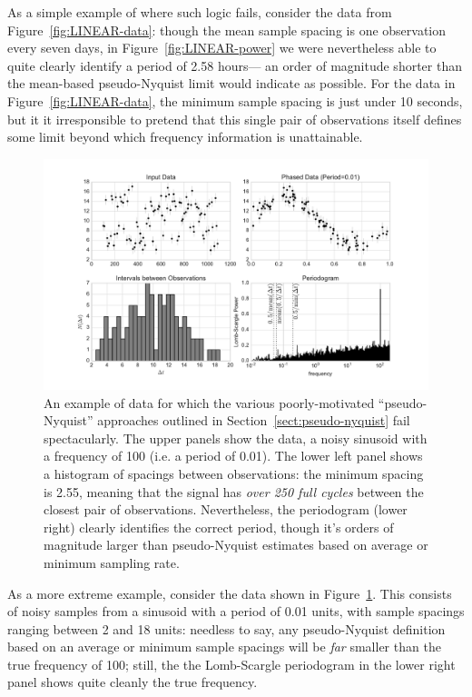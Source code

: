 \documentclass[preprint]{aastex}
\newcommand{\fig}[1]{Figure~\ref{fig:#1}}
\newcommand{\figlabel}[1]{\label{fig:#1}}
\newcommand{\Sect}[1]{Section~\ref{sect:#1}}
\newcommand{\sect}[1]{\Sect{#1}}
\begin{document}
As a simple example of where such logic fails,
consider the data from \fig{LINEAR-data}: though the mean sample
spacing is one observation every seven days, in \fig{LINEAR-power}
we were nevertheless able to quite clearly identify a period of 2.58 hours---
an order of magnitude shorter than the mean-based pseudo-Nyquist limit
would indicate as possible.
For the data in \fig{LINEAR-data}, the minimum sample spacing is just under 10
seconds, but it it irresponsible to pretend that this single pair of
observations itself defines some limit beyond which frequency information is
unattainable.

\begin{figure}[ht]
  \centering
  \includegraphics[width=\textwidth]{fig12_pseudo_nyquist}
  \caption{An example of data for which the various poorly-motivated
    ``pseudo-Nyquist'' approaches outlined in \sect{pseudo-nyquist} fail
    spectacularly. The upper panels show the data, a noisy sinusoid with
    a frequency of 100 (i.e. a period of 0.01).
    The lower left panel shows a histogram of spacings between observations:
    the minimum spacing is 2.55, meaning that the signal has
    {\it over 250 full cycles} between the closest pair of observations.
    Nevertheless, the periodogram (lower right) clearly identifies the correct
    period, though it's orders of magnitude larger than pseudo-Nyquist
    estimates based on average or minimum sampling rate.
    \figlabel{pseudo-nyquist}}
\end{figure}

As a more extreme example, consider the data shown in \fig{pseudo-nyquist}.
This consists of noisy samples from a sinusoid with a period of 0.01 units,
with sample spacings ranging between 2 and 18 units: needless to say, any
pseudo-Nyquist definition based on an average or minimum sample spacings
will be {\it far} smaller than the true frequency of 100; still, the
the Lomb-Scargle periodogram in the lower right panel shows quite cleanly
the true frequency.
\end{document}
